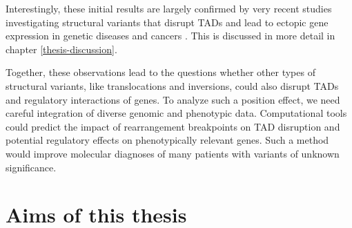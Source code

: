 \documentclass[a4paper,twoside=true,openright,parskip=full,chapterprefix=true,11pt,headings=normal,bibliography=totoc,listof=totoc,titlepage=on,captions=tableabove,draft=false]{scrreprt}
\theoremstyle{definition}
\theoremstyle{definition}
\theoremstyle{definition}
\theoremstyle{remark}
\begin{document}
Interestingly, these initial results are largely confirmed by very
recent studies investigating structural variants that disrupt TADs and
lead to ectopic gene expression in genetic diseases
\citep{Lupianez2015, Franke2016, Redin2017} and cancers
\citep{Northcott2014, Hnisz2016, Weischenfeldt2016}. This is discussed
in more detail in chapter \ref{thesis-discussion}.

Together, these observations lead to the questions whether other types
of structural variants, like translocations and inversions, could also
disrupt TADs and regulatory interactions of genes. To analyze such a
position effect, we need careful integration of diverse genomic and
phenotypic data. Computational tools could predict the impact of
rearrangement breakpoints on TAD disruption and potential regulatory
effects on phenotypically relevant genes. Such a method would improve
molecular diagnoses of many patients with variants of unknown
significance.

\hypertarget{aims-of-this-thesis}{%
\section{Aims of this thesis}\label{aims-of-this-thesis}}
\end{document}
